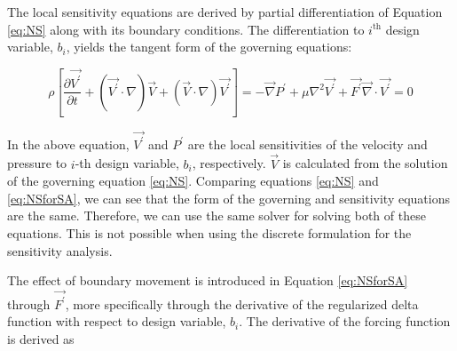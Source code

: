 \documentclass[12pt]{aiaa-pretty}
\begin{document}
The local sensitivity equations are derived by partial differentiation of Equation \eqref{eq:NS} along with its boundary conditions. The differentiation to $i^\text{th}$ design variable, $b_i$, yields the tangent form of the governing equations:

%
\begin{subequations}\label{eq:NSforSA}
\begin{equation}
	\rho \left[
	\frac{\partial \vec{V^\prime}}{\partial t} + 
	\left( \vec{V^\prime} \cdot \nabla \right) \vec{V} + 
	\left( \vec{V} \cdot \nabla \right) \vec{V^\prime}
	\right] = 
	-\vec{\nabla} P^\prime + \mu \nabla^2 \vec{V^\prime} + \vec{F^\prime}
\end{equation}
\begin{equation}
	\vec{\nabla} \cdot \vec{V^\prime} = 0
\end{equation}
\end{subequations}
%

In the above equation, $\vec{V^\prime}$ and $P^\prime$ are the local sensitivities of the velocity and pressure to $i$-th design variable, $b_i$, respectively. $\vec{V}$ is calculated from the solution of the governing equation \eqref{eq:NS}. Comparing equations \eqref{eq:NS} and \eqref{eq:NSforSA}, we can see that the form of the governing and sensitivity equations are the same. Therefore, we can use the same solver for solving both of these equations. This is not possible when using the discrete formulation for the sensitivity analysis.

The effect of boundary movement is introduced in Equation \eqref{eq:NSforSA} through $\vec{F^\prime}$, more specifically through the derivative of the regularized delta function with respect to design variable, $b_i$. The derivative of the forcing function is derived as
\end{document}
